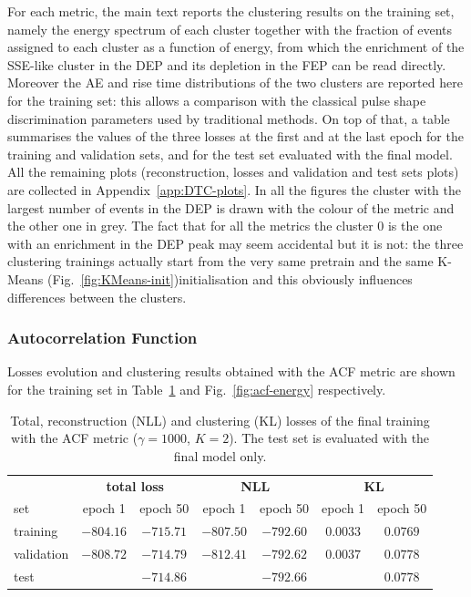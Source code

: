For each metric, the main text reports the clustering results on the training set, namely the energy spectrum of each cluster together with the fraction of events assigned to each cluster as a function of energy, from which the enrichment of the \ac{SSE}-like cluster in the \ac{DEP} and its depletion in the \ac{FEP} can be read directly. Moreover the \ac{AE} and rise time distributions of the two clusters are reported here for the training set: this allows a comparison with the classical pulse shape discrimination parameters used by traditional methods. On top of that, a table summarises the values of the three losses at the first and at the last epoch for the training and validation sets, and for the test set evaluated with the final model. All the remaining plots (reconstruction, losses and validation and test sets plots) are collected in Appendix~\ref{app:DTC-plots}. In all the figures the cluster with the largest number of events in the \ac{DEP} is drawn with the colour of the metric and the other one in grey. The fact that for all the metrics the cluster 0 is the one with an enrichment in the \ac{DEP} peak may seem accidental but it is not: the three clustering trainings actually start from the very same pretrain and the same K-Means (Fig.~\ref{fig:KMeans-init})initialisation and this obviously influences differences between the clusters.



\subsubsection{Autocorrelation Function}
Losses evolution and clustering results obtained with the \ac{ACF} metric are shown for the training set in Table~\ref{tab:acf-losses} and Fig.~\ref{fig:acf-energy} respectively.

\begin{table}[H]
    \centering
    \begin{tabular}{lcccccc}
        \hline
         & \multicolumn{2}{c}{\textbf{total loss}} & \multicolumn{2}{c}{\textbf{\ac{NLL}}} & \multicolumn{2}{c}{\textbf{\ac{KL}}} \\
        set & epoch 1 & epoch 50 & epoch 1 & epoch 50 & epoch 1 & epoch 50 \\
        \hline
        training   & $-804.16$ & $-715.71$ & $-807.50$ & $-792.60$ & $0.0033$ & $0.0769$ \\
        validation & $-808.72$ & $-714.79$ & $-812.41$ & $-792.62$ & $0.0037$ & $0.0778$ \\
        test       &           & $-714.86$ &           & $-792.66$ &          & $0.0778$ \\
        \hline
    \end{tabular}
    \caption{Total, reconstruction (\ac{NLL}) and clustering (\ac{KL}) losses of the final training with the \ac{ACF} metric ($\gamma = 1000$, $K=2$). The test set is evaluated with the final model only.}
    \label{tab:acf-losses}
\end{table}

